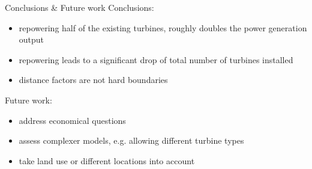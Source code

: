 \documentclass[color=usenames,dvipsnames]{beamer}
\begin{document}
    \begin{frame}{Conclusions \& Future work}
        Conclusions:\\
        \begin{itemize}
            \item repowering half of the existing turbines, roughly doubles the
                power generation output\pause
            \item repowering leads to a significant drop of total number of
                turbines installed\pause
            \item distance factors are not hard boundaries\pause
        \end{itemize}

        \bigskip

        Future work:\\
        \begin{itemize}
            \item address economical questions\pause
            \item assess complexer models, e.g. allowing different turbine types\pause
            \item take land use or different locations into account
        \end{itemize}
    \end{frame}
\end{document}
